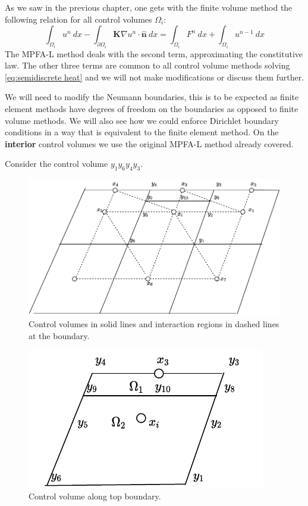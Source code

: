 \documentclass[../Main/main.tex]{subfiles}
\begin{document}
	As we saw in the previous chapter, one gets with the finite volume method the following relation for all control volumes $\Omega_i$:
	\begin{equation}
		\int_{\Omega_i} u^n \ dx - \int_{\partial \Omega_i} \pmb{K}\nabla u^n \cdot \hat{\pmb{n}}\ dx = \int_{\Omega_i} F^n \ dx + \int_{\Omega_i} u^{n-1} \ dx
	\end{equation}
	The MPFA-L method deals with the second term, approximating the constitutive law. The other three terms are common to all control volume methods solving \eqref{eq:semidiscrete heat} and we will not make modifications or discuss them further.
	\par
	We will need to modify the Neumann boundaries, this is to be expected as finite element methods have degrees of freedom on the boundaries as opposed to finite volume methods. We will also see how we could enforce Dirichlet boundary conditions in a way that is equivalent to the finite element method. On the \textbf{interior} control volumes we use the original MPFA-L method already covered.
	\par
	Consider the control volume $y_1 y_6 y_4 y_3$. 
	\begin{figure}[H]
		\centering
		\includegraphics{modified_L_scheme.pdf}
		\caption{Control volumes in solid lines and interaction regions in dashed lines at the boundary.}
	\end{figure}
	\begin{figure}[H]\label{fig:volumepartition}
		\centering
		\includegraphics{volumepartition.pdf}
		\caption{Control volume along top boundary.}
	\end{figure}
\end{document}
